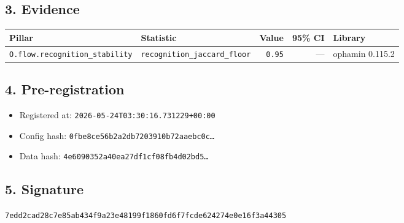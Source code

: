 \documentclass{article}
\begin{document}
\subsection*{3. Evidence}
\begin{tabular}{llrrl}\toprule
\textbf{Pillar} & \textbf{Statistic} & \textbf{Value} & \textbf{95\% CI} & \textbf{Library} \\\midrule
\texttt{O.flow.recognition\_stability} & \texttt{recognition\_jaccard\_floor} & \texttt{0.95} & --- & ophamin 0.115.2 \\
\bottomrule\end{tabular}
\subsection*{4. Pre-registration}
\begin{itemize}
\item Registered at: \texttt{2026-05-24T03:30:16.731229+00:00}
\item Config hash: \texttt{0fbe8ce56b2a2db7203910b72aaebc0c\dots}
\item Data hash: \texttt{4e6090352a40ea27df1cf08fb4d02bd5\dots}
\end{itemize}
\subsection*{5. Signature}
\texttt{7edd2cad28c7e85ab434f9a23e48199f1860fd6f7fcde624274e0e16f3a44305}\\
\end{document}
